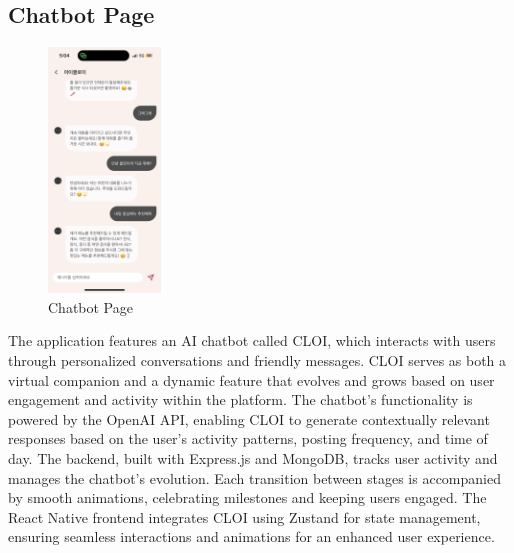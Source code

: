 \documentclass[conference]{IEEEtran}
\begin{document}
\subsection{Chatbot Page}
        \begin{figure}[htbp]
            \centerline{\includegraphics[width=3cm]{Images/page/chatbot.png}}
            \caption{Chatbot Page}
            \label{fig}
        \end{figure}
        The application features an AI chatbot called CLOI, which interacts with users through personalized conversations and friendly messages. CLOI serves as both a virtual companion and a dynamic feature that evolves and grows based on user engagement and activity within the platform.
        The chatbot's functionality is powered by the OpenAI API, enabling CLOI to generate contextually relevant responses based on the user's activity patterns, posting frequency, and time of day.
        The backend, built with Express.js and MongoDB, tracks user activity and manages the chatbot's evolution. Each transition between stages is accompanied by smooth animations, celebrating milestones and keeping users engaged. The React Native frontend integrates CLOI using Zustand for state management, ensuring seamless interactions and animations for an enhanced user experience.
\end{document}
